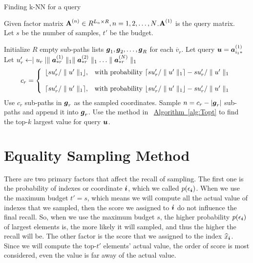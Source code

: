 \documentclass{article}
\newcommand{\V}[1]{{\bm{{\MakeLowercase{#1}}}}}%
\newcommand{\VnC}[3]{\V{#1}^{(#2)}_{#3}}%
\newcommand{\Vacol}[1]{\V{a}^{(#1)}_{*r}}
\newcommand{\M}[1]{{\bm{\mathbf{\MakeUppercase{#1}}}}}%
\newcommand{\norm}[2]{\parallel#1\parallel_{#2}}
\newcommand{\Alg}[1]{\hyperref[alg:#1]{Algorithm~\ref*{alg:#1}}}
\begin{document}
\begin{algorithm}[t]
    \caption{Finding k-NN for a query}
    \label{alg:QuerySampling}
        Given factor matrix $\M{A}^{(n)}\in R^{L_n\times R}, n = 1,2,\ldots,N$.$\M{A}^{(1)}$ is the query matrix.\\
        Let $s$ be the number of samples, $t'$ be the budget.
    \begin{algorithmic}[1]
    \State Initialize $R$ empty sub-paths lists $\V{g}_1,\V{g}_2,\ldots,\V{g}_R$ for each $\overline{v}_r$.
    \State Let query $\V{u}=\VnC{a}{1}{i_1*}$
    \State Let $u'_r \leftarrow \mid u_r\mid \norm{\Vacol{1}}{1} \norm{\Vacol{2}}{1} \ldots \norm{\Vacol{N}}{1}$
    \EndFor
    \State
    \begin{equation*}c_r=
        \left\{
          \begin{array}{ll}
            \lfloor su'_r/\norm{u'}{1} \rfloor,
            & \hbox{with probability $\lceil su'_r/\norm{u'}{1} \rceil - su'_r/\norm{u'}{1}$} \\\\
            \lceil su'_r/\norm{u'}{1} \rceil,
            & \hbox{with probability $\lfloor su'_r/\norm{u'}{1} \rfloor - su'_r/\norm{u'}{1}$}
          \end{array}
        \right.
    \end{equation*}
    \EndFor
    \If {$c_r\leq |\V{g}_r|$ }
    \State Use $c_r$ sub-paths in $\V{g}_r$ as the sampled coordinates.
    \Else
    \State Sample $n = c_r - |\V{g}_r|$ sub-paths and append it into $\V{g}_r$.
    \EndIf
    \State Use the method in ~\Alg{Topt} to find the top-$k$ largest value for query $\V{u}$.
    \EndFor
    \EndFor
    \end{algorithmic}
\end{algorithm}

\section{Equality Sampling Method}

There are two primary factors that affect the recall of sampling. The first one is the probability of indexes or coordinate $\V{i}$, which we called $p(\epsilon_{\V{i}})$. When we use the maximum budget $t'=s$, which means we will compute all the actual value of indexes that we sampled, then the score we assigned to $\V{i}$ do not influence the final recall. So, when we use the maximum budget $s$, the higher probability $p(\epsilon_{\V{i}})$ of largest elements is, the more likely it will sampled, and thus the higher the recall will be. The other factor is the score that we assigned to the index $\widehat{x}_{\V{i}}$. Since we will compute the top-$t'$ elements' actual value, the order of score is most considered, even the value is far away of the actual value.
\end{document}
